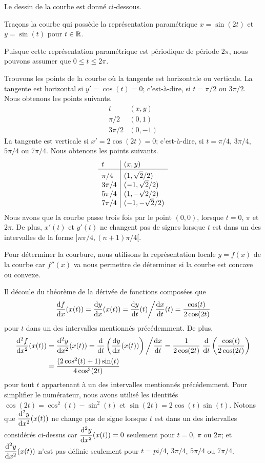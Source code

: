 {\begin{egg}[\theory]
Le dessin de la courbe est donné ci-dessous.
\end{egg}

\begin{egg}[\theory]
Traçons la courbe qui possède la représentation paramétrique
$x = \sin(2t)$ et $y = \sin(t)$ pour $t \in \RR$.

Puisque cette représentation paramétrique est périodique de période
$2\pi$, nous pouvons assumer que $0\leq t \leq 2\pi$.

Trouvons les points de la courbe où la tangente est
horizontale ou verticale.  La tangente est horizontal si
$y'= \cos(t)= 0$; c'est-à-dire, si $t= \pi/2$ ou $3\pi/2$.  Nous obtenons
les points suivants.
\[
\begin{array}{l|l}
t & (x,y) \\
\hline
\pi/2 & (0,1) \\
3\pi/2 & (0,-1)
\end{array}
\]
La tangente est verticale si $x'= 2\cos(2t) = 0$; c'est-à-dire, si
$t=\pi/4$, $3\pi/4$, $5\pi/4$ ou $7\pi/4$.  Nous obtenons les points
suivants.
\[
\begin{array}{l|l}
t & (x,y) \\
\hline
\rule{0em}{1.2em} \pi/4 & (1, \sqrt{2}/2) \\
3\pi/4 & (-1, \sqrt{2}/2) \\
5\pi/4 & (1, -\sqrt{2}/2) \\
7\pi/4 & (-1, -\sqrt{2}/2)
\end{array}
\]
Nous avons que la courbe passe trois fois par le point $(0,0)$, lorsque
$t=0$, $\pi$ et $2\pi$.  De plus, $x'(t)$ et $y'(t)$ ne changent pas
de signes lorsque $t$ est dans un des intervalles de la forme
$]n\pi/4 , (n+1)\pi/4[$. 

Pour déterminer la courbure, nous utilisons la représentation locale
$y=f(x)$ de la courbe car $f''(x)$ va nous permettre de déterminer
si la courbe est concave ou convexe.

Il découle du théorème de la dérivée de fonctions composées que
\[
\dydx{f}{x}(x(t)) = \dydx{y}{x}(x(t)) = \dydx{y}{t}(t) \bigg/ \dydx{x}{t}(t)
= \frac{\cos(t)}{2\cos(2t)}
\]
pour $t$ dans un des intervalles mentionnés précédemment.  De plus,
\begin{align*}
\dydxn{f}{x}{2}(x(t)) &= \dydxn{y}{x}{2}(x(t)) =
\dfdx{\left( \dydx{y}{x}(x(t)) \right)}{t}\bigg/\dydx{x}{t}
= \frac{1}{2\cos(2t)}\;
\dfdx{\left( \frac{\cos(t)}{2\cos(2t)} \right)}{t} \\
&= \frac{(2\cos^2(t)+1)\sin(t)}{4\cos^3(2t)}
\end{align*}
pour tout $t$ appartenant à un des intervalles mentionnés
précédemment.  Pour simplifier le numérateur, nous avons utilisé les
identités $\cos(2t) = \cos^2(t)-\sin^2(t)$ et $\sin(2t) = 2\cos(t)\sin(t)$.
Notons que $\DS \dydxn{y}{x}{2}(x(t))$ ne change pas de
signe lorsque $t$ est dans un des intervalles considérés ci-dessus
car $\DS \dydxn{y}{x}{2}(x(t)) =0$ seulement pour $t=0$,
$\pi$ ou $2\pi$; et $\DS \dydxn{y}{x}{2}(x(t))$ n'est pas
définie seulement pour $t= pi/4$, $3\pi/4$, $5\pi/4$ ou $7\pi/4$.


\end{egg}}
